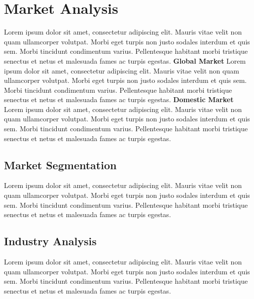 \documentclass[11pt,a4paper,titlepage]{article}
\begin{document}
\section{Market Analysis}
Lorem ipsum dolor sit amet, consectetur adipiscing elit. Mauris vitae velit 
non quam ullamcorper volutpat. Morbi eget turpis non justo sodales interdum 
et quis sem. Morbi tincidunt condimentum varius. Pellentesque habitant morbi 
tristique senectus et netus et malesuada fames ac turpis egestas.\newline
\textbf{Global Market}\newline
Lorem ipsum dolor sit amet, consectetur adipiscing elit. Mauris vitae velit 
non quam ullamcorper volutpat. Morbi eget turpis non justo sodales interdum 
et quis sem. Morbi tincidunt condimentum varius. Pellentesque habitant morbi 
tristique senectus et netus et malesuada fames ac turpis egestas.\newline
\textbf{Domestic Market}\newline
Lorem ipsum dolor sit amet, consectetur adipiscing elit. Mauris vitae velit 
non quam ullamcorper volutpat. Morbi eget turpis non justo sodales interdum 
et quis sem. Morbi tincidunt condimentum varius. Pellentesque habitant morbi 
tristique senectus et netus et malesuada fames ac turpis egestas.\newline

\subsection{Market Segmentation}
Lorem ipsum dolor sit amet, consectetur adipiscing elit. Mauris vitae velit 
non quam ullamcorper volutpat. Morbi eget turpis non justo sodales interdum 
et quis sem. Morbi tincidunt condimentum varius. Pellentesque habitant morbi 
tristique senectus et netus et malesuada fames ac turpis egestas.\newline

\subsection{Industry Analysis}
Lorem ipsum dolor sit amet, consectetur adipiscing elit. Mauris vitae velit 
non quam ullamcorper volutpat. Morbi eget turpis non justo sodales interdum 
et quis sem. Morbi tincidunt condimentum varius. Pellentesque habitant morbi 
tristique senectus et netus et malesuada fames ac turpis egestas.\newline
\hypertarget{competition_and_buying_patterns}{}
\end{document}
